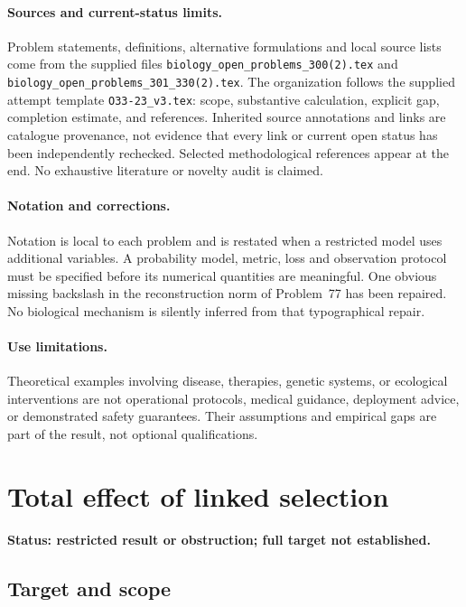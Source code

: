 \documentclass[11pt]{article}
\begin{document}
\paragraph{Sources and current-status limits.}
Problem statements, definitions, alternative formulations and local source lists
come from the supplied files
\texttt{biology\_open\_problems\_300(2).tex} and
\texttt{biology\_open\_problems\_301\_330(2).tex}.
The organization follows the supplied attempt template
\texttt{O33-23\_v3.tex}: scope, substantive calculation, explicit gap,
completion estimate, and references. Inherited source annotations and links are
catalogue provenance, not evidence that every link or current open status has
been independently rechecked. Selected methodological references appear at the
end. No exhaustive literature or novelty audit is claimed.

\paragraph{Notation and corrections.}
Notation is local to each problem and is restated when a restricted model uses
additional variables. A probability model, metric, loss and observation protocol
must be specified before its numerical quantities are meaningful. One obvious
missing backslash in the reconstruction norm of Problem~77 has been repaired.
No biological mechanism is silently inferred from that typographical repair.

\paragraph{Use limitations.}
Theoretical examples involving disease, therapies, genetic systems, or ecological
interventions are not operational protocols, medical guidance, deployment advice,
or demonstrated safety guarantees. Their assumptions and empirical gaps are part
of the result, not optional qualifications.


\section*{Total effect of linked selection}
\label{prob:166}
\noindent\textbf{Status: restricted result or obstruction; full target not established.}
\subsection{Target and scope}
\end{document}
